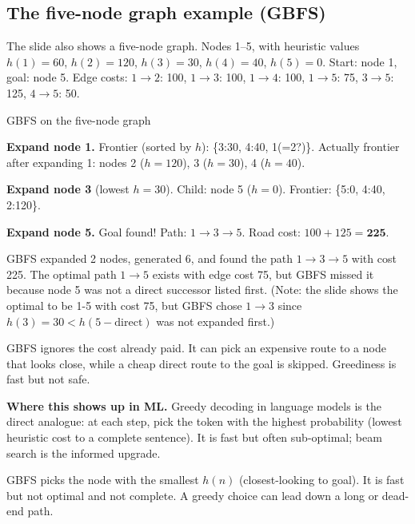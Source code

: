 \documentclass[a4paper,11pt]{article}
\begin{document}
\subsection*{The five-node graph example (GBFS)}

The slide also shows a five-node graph. Nodes 1--5, with heuristic values
$h(1)=60$, $h(2)=120$, $h(3)=30$, $h(4)=40$, $h(5)=0$. Start: node 1,
goal: node 5. Edge costs: $1\to2$: 100, $1\to3$: 100, $1\to4$: 100,
$1\to5$: 75, $3\to5$: 125, $4\to5$: 50.

\begin{worked}{GBFS on the five-node graph}
\begin{steps}
  \item \textbf{Expand node 1.} Frontier (sorted by $h$):
        \{3:30, 4:40, 1(=2?)\}. Actually frontier after expanding 1:
        nodes 2 ($h=120$), 3 ($h=30$), 4 ($h=40$).
  \item \textbf{Expand node 3} (lowest $h=30$). Child: node 5 ($h=0$).
        Frontier: \{5:0, 4:40, 2:120\}.
  \item \textbf{Expand node 5.} Goal found!
        Path: $1 \to 3 \to 5$. Road cost: $100 + 125 = \mathbf{225}$.
\end{steps}
GBFS expanded 2 nodes, generated 6, and found the path $1\to3\to5$ with
cost 225. The optimal path $1\to5$ exists with edge cost 75, but GBFS
missed it because node 5 was not a direct successor listed first.
(Note: the slide shows the optimal to be 1-5 with cost 75, but GBFS
chose $1\to3$ since $h(3)=30 < h(5-\text{direct})$ was not expanded first.)
\end{worked}

\begin{watchout}
GBFS ignores the cost already paid. It can pick an expensive route to a node
that looks close, while a cheap direct route to the goal is skipped.
Greediness is fast but not safe.
\end{watchout}

\noindent\textbf{Where this shows up in ML.}
Greedy decoding in language models is the direct analogue: at each step, pick
the token with the highest probability (lowest heuristic cost to a complete
sentence). It is fast but often sub-optimal; beam search is the informed
upgrade.

\begin{keytake}
GBFS picks the node with the smallest $h(n)$ (closest-looking to goal). It
is fast but not optimal and not complete. A greedy choice can lead down a
long or dead-end path.
\end{keytake}
\end{document}
